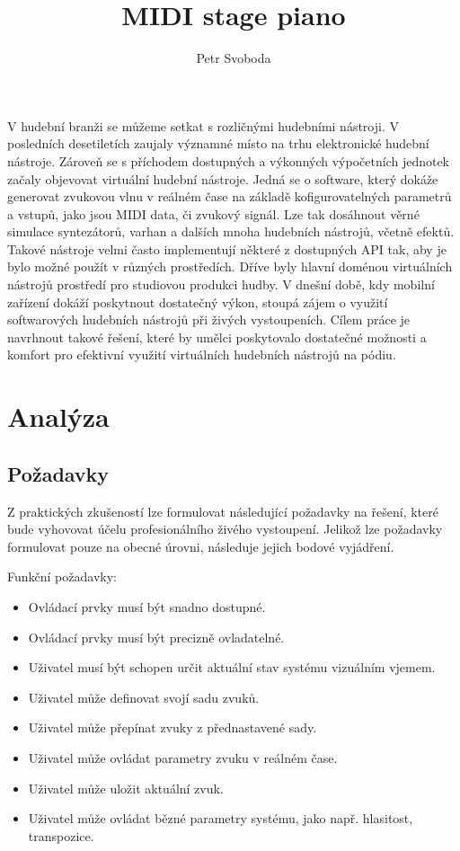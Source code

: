 \documentclass[thesis=M,czech]{FITthesis}[2019/03/06]
\title{MIDI stage piano}
\author{Petr Svoboda} %
\begin{document}

\begin{introduction}
V hudební branži se můžeme setkat s rozličnými hudebními nástroji. V posledních desetiletích
zaujaly významné místo na trhu elektronické hudební nástroje. Zároveň se s příchodem dostupných a výkonných
výpočetních jednotek začaly objevovat virtuální hudební nástroje\cite{kogan2008brief}.
Jedná se o software, který dokáže generovat zvukovou vlnu v reálném čase na základě kofigurovatelných parametrů a vstupů, jako jsou MIDI data, či zvukový signál.
Lze tak dosáhnout věrné simulace syntezátorů, varhan a dalších mnoha hudebních nástrojů, včetně efektů.
Takové nástroje velmi často implementují některé z dostupných API tak, aby je bylo možné použít v různých prostředích.
Dříve byly hlavní doménou virtuálních nástrojů prostředí pro studiovou produkci hudby\cite{leider2004digital}.
V dnešní době, kdy mobilní zařízení dokáží poskytnout dostatečný výkon, stoupá zájem o využití softwarových hudebních nástrojů
při živých vystoupeních. Cílem práce je navrhnout takové řešení, které by umělci poskytovalo dostatečné možnosti a komfort 
pro efektivní využití virtuálních hudebních nástrojů na pódiu.
\end{introduction}

\chapter{Analýza}
	\section{Požadavky}
		Z praktických zkušeností lze formulovat následující požadavky na řešení, které bude vyhovovat účelu profesionálního živého vystoupení.
		Jelikož lze požadavky formulovat pouze na obecné úrovni, následuje jejich bodové vyjádření.
		
		Funkční požadavky:
		\begin{itemize}
			\item Ovládací prvky musí být snadno dostupné.
			\item Ovládací prvky musí být precizně ovladatelné.
			\item Uživatel musí být schopen určit aktuální stav systému vizuálním vjemem.
			\item Uživatel může definovat svojí sadu zvuků.
			\item Uživatel může přepínat zvuky z přednastavené sady.
			\item Uživatel může ovládat parametry zvuku v reálném čase.
			\item Uživatel může uložit aktuální zvuk.
			\item Uživatel může ovládat bězné parametry systému, jako např. hlasitost, transpozice.
		\end{itemize}
	
\end{document}
